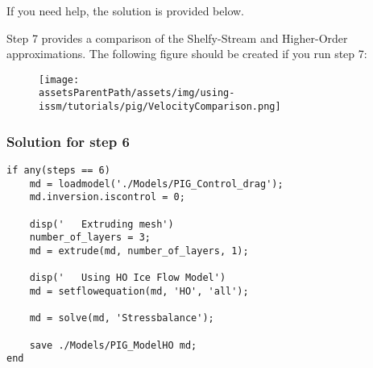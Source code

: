If you need help, the solution is provided below.

Step 7 provides a comparison of the Shelfy-Stream and Higher-Order approximations. The following figure should be created if you run step 7:
\begin{figure}[H]
	\begin{center}
		\texttt{[image: \\assetsParentPath/assets/img/using-issm/tutorials/pig/VelocityComparison.png]}
	\end{center}
\end{figure}
\subsubsection{Solution for step 6}%
\begin{lstlisting}
if any(steps == 6)
	md = loadmodel('./Models/PIG_Control_drag');
	md.inversion.iscontrol = 0;

	disp('   Extruding mesh')
	number_of_layers = 3;
	md = extrude(md, number_of_layers, 1);

	disp('   Using HO Ice Flow Model')
	md = setflowequation(md, 'HO', 'all');

	md = solve(md, 'Stressbalance');

	save ./Models/PIG_ModelHO md;
end
\end{lstlisting}

\clearpage %
